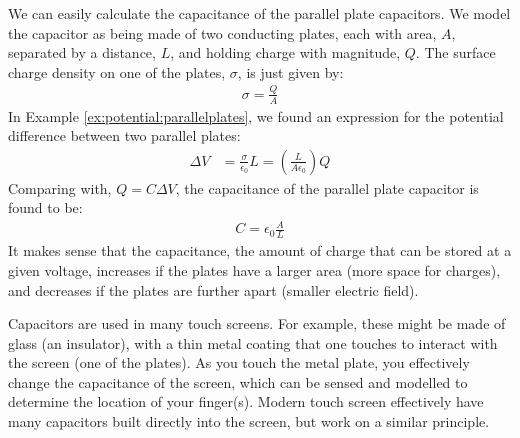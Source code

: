We can easily calculate the capacitance of the parallel plate capacitors. We model the capacitor as being made of two conducting plates, each with area, $A$, separated by a distance, $L$, and holding charge with magnitude, $Q$. The surface charge density on one of the plates, $\sigma$, is just given by:
\begin{align*}
\sigma =\frac{Q}{A}
\end{align*} 
In Example \ref{ex:potential:parallelplates}, we found an expression for the potential difference between two parallel plates:
\begin{align*}
\Delta V &= \frac{\sigma}{\epsilon_0}L=\left(\frac{L}{A\epsilon_0}\right)Q
\end{align*}
Comparing with, $Q=C\Delta V$, the capacitance of the parallel plate capacitor is found to be:
\begin{align*}
C=\epsilon_0\frac{A}{L}
\end{align*}
It makes sense that the capacitance, the amount of charge that can be stored at a given voltage, increases if the plates have a larger area (more space for charges), and decreases if the plates are further apart (smaller electric field).

Capacitors are used in many touch screens. For example, these might be made of glass (an insulator), with a thin metal coating that one touches to interact with the screen (one of the plates). As you touch the metal plate, you effectively change the capacitance of the screen, which can be sensed and modelled to determine the location of your finger(s). Modern touch screen effectively have many capacitors built directly into the screen, but work on a similar principle. 

